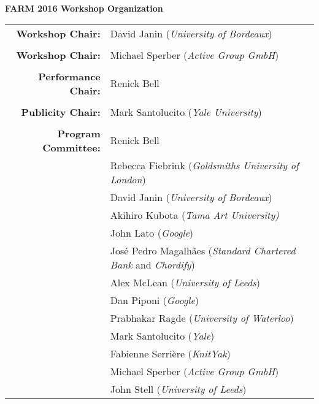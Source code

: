 \documentclass[10pt]{sigplanconf}
\begin{document}
\vspace{2mm}

\newpage
\begin{center}
{\bfseries \Huge FARM 2016 Workshop Organization}
\end{center}

\bigskip

\large
\begin{center}
\begin{tabular}{rl}

{\bf Workshop Chair:} & David Janin (\emph{University of Bordeaux})\\
\\

{\bf Workshop Chair:} & Michael Sperber (\emph{Active Group GmbH})\\
  \\

  {\bf Performance Chair:} & Renick Bell\\
  \\

{\bf Publicity Chair:} & Mark Santolucito (\emph{Yale University})\\

\\

  {\bf Program Committee:} & Renick Bell\\
                      & Rebecca Fiebrink (\emph{Goldsmiths University of London})\\
                      & David Janin (\emph{University of Bordeaux})\\
                      & Akihiro Kubota (\emph{Tama Art University)}\\
                      & John Lato (\emph{Google})\\
                      & José Pedro Magalhães (\textit{Standard Chartered Bank} and \textit{Chordify})\\
                      & Alex McLean (\emph{University of Leeds})\\
                      & Dan Piponi (\emph{Google})\\
                      & Prabhakar Ragde (\emph{University of Waterloo})\\
                      & Mark Santolucito (\emph{Yale})\\
                      & Fabienne Serrière (\emph{KnitYak})\\
                      & Michael Sperber (\emph{Active Group GmbH})\\
                      & John Stell (\emph{University of Leeds})
\end{tabular}
\end{center}

\vspace{2mm}
\end{document}
